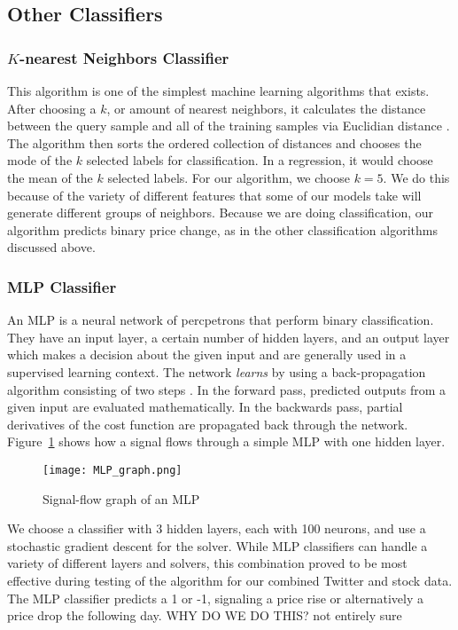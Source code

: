 \documentclass[../thesis.tex]{subfiles}
\begin{document}
\subsection{Other Classifiers}

\subsubsection{$K$-nearest Neighbors Classifier}
This algorithm is one of the simplest machine learning algorithms that exists. After choosing a $k$, or amount of nearest neighbors, it calculates the distance between the query sample and all of the training samples via Euclidian distance \cite{PedregosaFABIANPEDREGOSA2011}. The algorithm then sorts the ordered collection of distances and chooses the mode of the $k$ selected labels for classification. In a regression, it would choose the mean of the $k$ selected labels. For our  algorithm, we choose $k=5$. We do this because of the variety of different features that some of our models take will generate different groups of neighbors. Because we are doing classification, our algorithm predicts binary price change, as in the other classification algorithms discussed above. 

\subsubsection{MLP Classifier}
An MLP is a neural network of percpetrons that perform binary classification. They have an input layer, a certain number of hidden layers, and an output layer which makes a decision about the given input and are generally used in a supervised learning context. The network \textit{learns} by using a back-propagation algorithm consisting of two steps \cite{Honkela2001}. In the forward pass, predicted outputs from a given input are evaluated mathematically. In the backwards pass, partial derivatives of the cost function are propagated back through the network. Figure~\ref{MLPgraph} shows how a signal flows through a simple MLP with one hidden layer. 

\begin{figure}[h]
\centering
\texttt{[image: MLP\_graph.png]}
\caption{Signal-flow graph of an MLP \label{overflow}}
\label{MLPgraph}
\end{figure}

We choose a classifier with 3 hidden layers, each with 100 neurons, and use a stochastic gradient descent for the solver. While MLP classifiers can handle a variety of different layers and solvers, this combination proved to be most effective during testing of the algorithm for our combined Twitter and stock data. The MLP classifier predicts a 1 or -1, signaling a price rise or alternatively a price drop the following day. WHY DO WE DO THIS? not entirely sure
\end{document}

